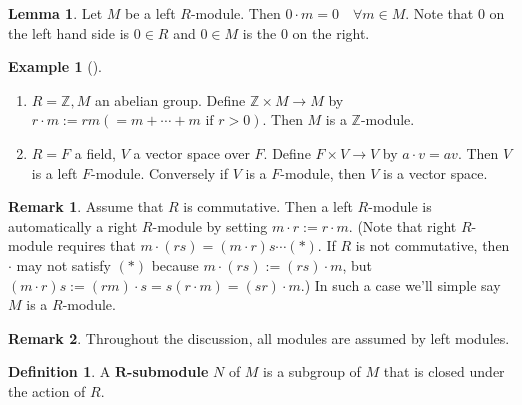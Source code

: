 \documentclass{article}
\theoremstyle{definition}
\newtheorem{ex}{Example}
\newtheorem{lem}{Lemma}
\newtheorem{dfn}{Definition}
\newtheorem{rem}{Remark}
\newenvironment{exs}[1][]{%
  \begin{ex}[#1]$ $\par\nobreak\ignorespaces
}{%
  \end{ex}
}
\newcommand{\ZZ}{\mathbb Z}
\begin{document}
\begin{lem}
	Let $M$ be a left $R$-module.
	Then $0 \cdot m = 0 \quad \forall m \in M$.
	Note that 0 on the left hand side is $0 \in R$ and $0 \in M$ is the 0 on the right.
\end{lem}

\begin{exs}
	\begin{enumerate}
		\item[(1)] $R = \ZZ, M$ an abelian group.
			Define $\ZZ \times M \to M$ by $r \cdot m := rm (= m + \cdots + m \text{ if } r > 0)$. 
			Then $M$ is a $\ZZ$-module.

		\item[(2)] $R = F$ a field, $V$ a vector space over $F$.
			Define $F \times V \to V$ by $a \cdot v = av$.
			Then $V$ is a left $F$-module.
			Conversely if $V$ is a $F$-module, then $V$ is a vector space.
	\end{enumerate}
\end{exs}

\begin{rem}
	Assume that $R$ is commutative.
	Then a left $R$-module is automatically a right $R$-module by setting $m \cdot r := r \cdot m$.
	(Note that right $R$-module requires that $m \cdot (r s) = (m \cdot r) s \cdots (*)$.
	If $R$ is not commutative, then $\cdot$ may not satisfy $(*)$ because $m \cdot (rs) := (r s) \cdot m$, but $(m \cdot r) s := (rm) \cdot s = s (r \cdot m) = (sr) \cdot m$.) 
	In such a case we'll simple say $M$ is a $R$-module.
\end{rem}

\begin{rem}
	Throughout the discussion, all modules are assumed by left modules.
\end{rem}

\begin{dfn}
	A \textbf{$\bm{R}$-submodule} $N$ of $M$ is a subgroup of $M$ that is closed under the action of $R$.
\end{dfn}
\end{document}
